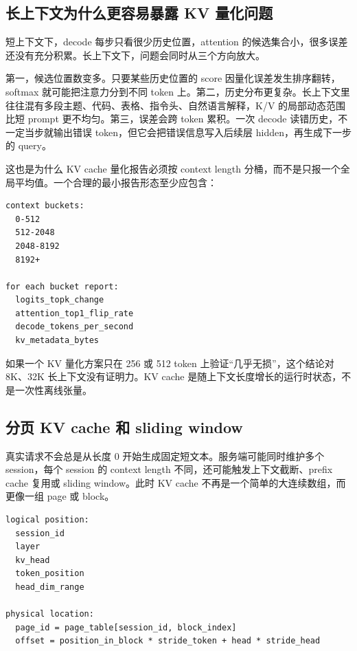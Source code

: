 \subsection{长上下文为什么更容易暴露 KV 量化问题}

短上下文下，decode 每步只看很少历史位置，attention 的候选集合小，很多误差还没有充分积累。长上下文下，问题会同时从三个方向放大。

第一，候选位置数变多。只要某些历史位置的 score 因量化误差发生排序翻转，softmax 就可能把注意力分到不同 token 上。第二，历史分布更复杂。长上下文里往往混有多段主题、代码、表格、指令头、自然语言解释，K/V 的局部动态范围比短 prompt 更不均匀。第三，误差会跨 token 累积。一次 decode 读错历史，不一定当步就输出错误 token，但它会把错误信息写入后续层 hidden，再生成下一步的 query。

这也是为什么 KV cache 量化报告必须按 context length 分桶，而不是只报一个全局平均值。一个合理的最小报告形态至少应包含：

\begin{lstlisting}[numbers=none,caption={长上下文量化报告的最小分桶}]
context buckets:
  0-512
  512-2048
  2048-8192
  8192+

for each bucket report:
  logits_topk_change
  attention_top1_flip_rate
  decode_tokens_per_second
  kv_metadata_bytes
\end{lstlisting}

\begin{warningbox}
如果一个 KV 量化方案只在 256 或 512 token 上验证“几乎无损”，这个结论对 8K、32K 长上下文没有证明力。KV cache 是随上下文长度增长的运行时状态，不是一次性离线张量。
\end{warningbox}

\subsection{分页 KV cache 和 sliding window}

真实请求不会总是从长度 0 开始生成固定短文本。服务端可能同时维护多个 session，每个 session 的 context length 不同，还可能触发上下文截断、prefix cache 复用或 sliding window。此时 KV cache 不再是一个简单的大连续数组，而更像一组 page 或 block。

\begin{lstlisting}[numbers=none,caption={分页 KV cache 的逻辑映射}]
logical position:
  session_id
  layer
  kv_head
  token_position
  head_dim_range

physical location:
  page_id = page_table[session_id, block_index]
  offset = position_in_block * stride_token + head * stride_head
\end{lstlisting}

